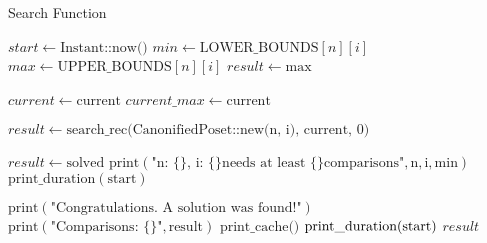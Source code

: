 \documentclass[a4paper]{article}
\begin{document}
\begin{algorithm}
    \caption{Search Function}
    \begin{algorithmic}[1]
        \State $start \gets \text{Instant::now()}$ 
        \State $min \gets \text{LOWER\_BOUNDS}[n][i]$
        \State $max \gets \text{UPPER\_BOUNDS}[n][i]$
        \State $result \gets \text{max}$
        \State

        \State $current \gets \text{current}$
        \State $current\_max \gets \text{current}$

        \State $result \gets \text{search\_rec(CanonifiedPoset::new(n, i), current, 0)}$ 

        \State $result \gets \text{solved}$
        \EndCase
        \State $\text{print}(\text{"n: \{\}, i: \{\} needs at least \{\} comparisons"}, \text{n}, \text{i}, \text{min})$
        \State $\text{print\_duration}(\text{start})$ 
        \State \Continue
        \EndCase
        \EndMatch
        \Break
        \State
        \EndFor

        \State
        \State $\text{print}(\text{"Congratulations. A solution was found!"})$
        \State $\text{print}(\text{"Comparisons: \{\}"}, \text{result})$
        \State
        \State $\text{print\_cache()}$ 
        \State $\text{print\_duration(\text{start})}$ 
        \State
        \State \Return $result$
        \EndFunction
    \end{algorithmic}
\end{algorithm}
\end{document}
